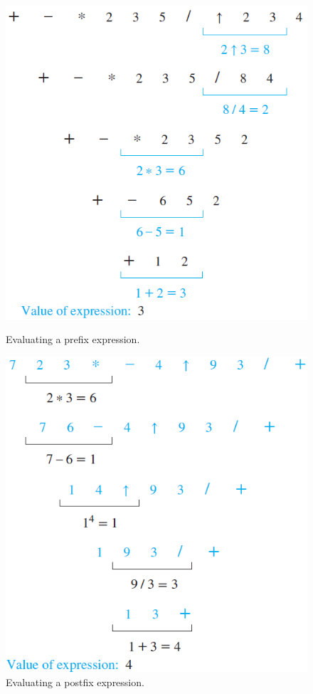 \documentclass{article}
\begin{document}
\begin{figure}[h!]
\begin{minipage}[c]{0.45\textwidth}
    \centering
    \includegraphics[width=\textwidth]{img/ch11.3-figure12.png}
    \caption{Evaluating a prefix expression.}
\end{minipage}\hfill
\begin{minipage}[c]{0.45\textwidth}
    \centering
    \includegraphics[width=\textwidth]{img/ch11.3-figure13.png}
    \caption{Evaluating a postfix expression.}
\end{minipage}\hfill
\end{figure}
\end{document}
